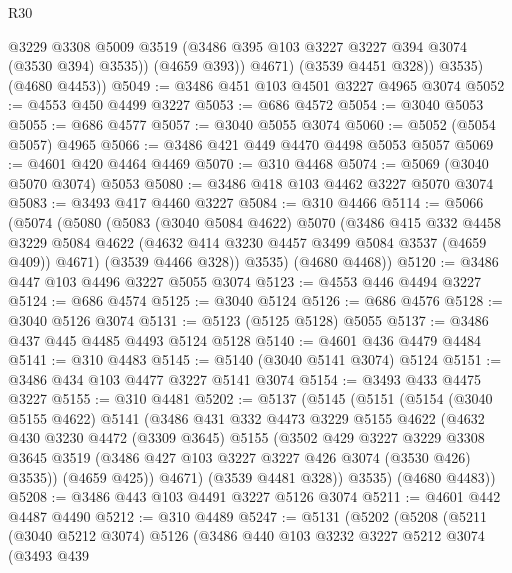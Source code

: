 \begin{lexlean}{R30}
\begin{coremodule}
                @3229
                @3308
                @5009
                @3519
                (@3486 @395 @103 @3227 @3227 @394 @3074 (@3530 @394) @3535))
              (@4659 @393))
            @4671)
          (@3539 @4451 @328))
        @3535)
      (@4680 @4453))
@5049 := @3486 @451 @103 @4501 @3227 @4965 @3074
@5052 := @4553 @450 @4499 @3227
@5053 := @686 @4572
@5054 := @3040 @5053
@5055 := @686 @4577
@5057 := @3040 @5055 @3074
@5060 := @5052 (@5054 @5057) @4965
@5066 := @3486 @421 @449 @4470 @4498 @5053 @5057
@5069 := @4601 @420 @4464 @4469
@5070 := @310 @4468
@5074 := @5069 (@3040 @5070 @3074) @5053
@5080 := @3486 @418 @103 @4462 @3227 @5070 @3074
@5083 := @3493 @417 @4460 @3227
@5084 := @310 @4466
@5114 := @5066
    (@5074
      (@5080
        (@5083
          (@3040 @5084 @4622)
          @5070
          (@3486
            @415
            @332
            @4458
            @3229
            @5084
            @4622
            (@4632 @414 @3230 @4457 @3499 @5084 @3537 (@4659 @409))
            @4671)
          (@3539 @4466 @328))
        @3535)
      (@4680 @4468))
@5120 := @3486 @447 @103 @4496 @3227 @5055 @3074
@5123 := @4553 @446 @4494 @3227
@5124 := @686 @4574
@5125 := @3040 @5124
@5126 := @686 @4576
@5128 := @3040 @5126 @3074
@5131 := @5123 (@5125 @5128) @5055
@5137 := @3486 @437 @445 @4485 @4493 @5124 @5128
@5140 := @4601 @436 @4479 @4484
@5141 := @310 @4483
@5145 := @5140 (@3040 @5141 @3074) @5124
@5151 := @3486 @434 @103 @4477 @3227 @5141 @3074
@5154 := @3493 @433 @4475 @3227
@5155 := @310 @4481
@5202 := @5137
    (@5145
      (@5151
        (@5154
          (@3040 @5155 @4622)
          @5141
          (@3486
            @431
            @332
            @4473
            @3229
            @5155
            @4622
            (@4632
              @430
              @3230
              @4472
              (@3309 @3645)
              @5155
              (@3502
                @429
                @3227
                @3229
                @3308
                @3645
                @3519
                (@3486 @427 @103 @3227 @3227 @426 @3074 (@3530 @426) @3535))
              (@4659 @425))
            @4671)
          (@3539 @4481 @328))
        @3535)
      (@4680 @4483))
@5208 := @3486 @443 @103 @4491 @3227 @5126 @3074
@5211 := @4601 @442 @4487 @4490
@5212 := @310 @4489
@5247 := @5131
    (@5202
      (@5208
        (@5211
          (@3040 @5212 @3074)
          @5126
          (@3486
            @440
            @103
            @3232
            @3227
            @5212
            @3074
            (@3493
              @439

\end{coremodule}
\end{lexlean}
